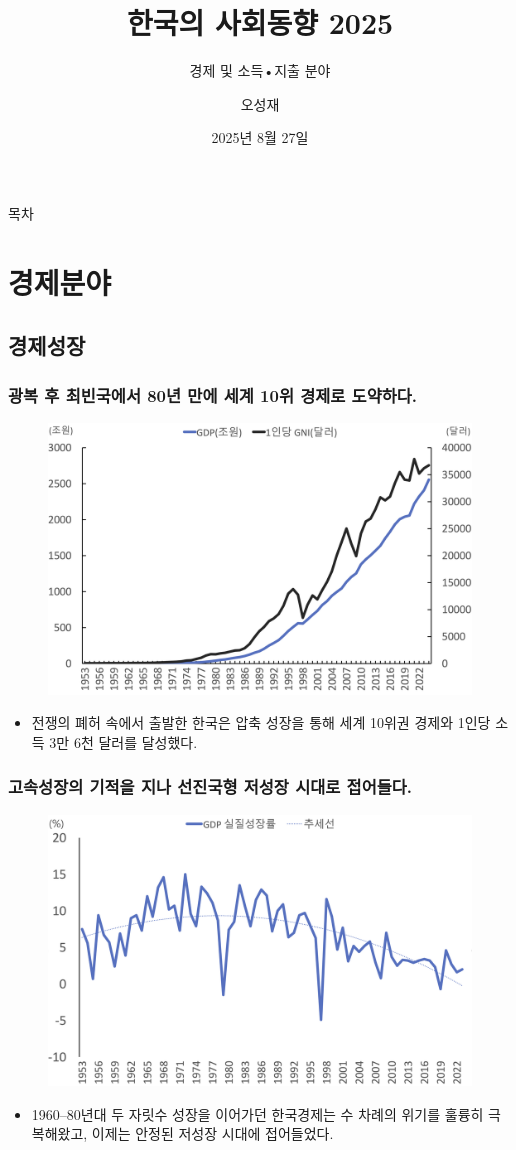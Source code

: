 \documentclass[aspectratio=169,xcolor=dvipsnames,handout]{beamer}
\title{한국의 사회동향 2025}
\subtitle{경제 및 소득•지출 분야}
\author{오성재}
\institute[KIHASA]
    {\relax
        제 5회 한국의 사회동향 포럼
    }
\date{2025년 8월 27일}
\begin{document}

\frame{\titlepage}

\begin{frame}{목차}
    \setcounter{tocdepth}{1}
    \tableofcontents
\end{frame}

\section{경제분야}
\subsection{경제성장}
\begin{frame}[<+->]
\frametitle{광복 후 최빈국에서 80년 만에 세계 10위 경제로 도약하다.}
    \begin{figure}
        \centering
        \includegraphics[width=.5\textwidth]{pic/fig_econ_01.png}
    \end{figure}
    \begin{itemize}
        \item 전쟁의 폐허 속에서 출발한 한국은 압축 성장을 통해 세계 10위권 경제와 1인당 소득 3만 6천 달러를 달성했다.
    \end{itemize}
\end{frame}

\begin{frame}[<+->]
\frametitle{고속성장의 기적을 지나 선진국형 저성장 시대로 접어들다.}
    \begin{figure}
        \centering
        \includegraphics[width=.5\textwidth]{pic/fig_econ_02.png}
    \end{figure}
    \begin{itemize}
        \item 1960--80년대 두 자릿수 성장을 이어가던 한국경제는 수 차례의 위기를 훌륭히 극복해왔고, 이제는 안정된 저성장 시대에 접어들었다.
    \end{itemize}
\end{frame}
\end{document}
